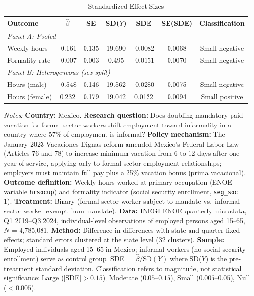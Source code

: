 \begin{table}[t]
\centering
\caption{Standardized Effect Sizes}
\label{tab:sde}
\small
\begin{tabular}{lcccccc}
  \toprule
  Outcome & $\hat{\beta}$ & SE & SD($Y$) & SDE & SE(SDE) & Classification \\
  \midrule
  \multicolumn{7}{l}{\textit{Panel A: Pooled}} \\
  Weekly hours & -0.161 & 0.135 & 19.690 & -0.0082 & 0.0068 & Small negative \\
  Formality rate & -0.007 & 0.003 & 0.495 & -0.0151 & 0.0070 & Small negative \\
  \midrule
  \multicolumn{7}{l}{\textit{Panel B: Heterogeneous (sex split)}} \\
  Hours (male) & -0.548 & 0.146 & 19.562 & -0.0280 & 0.0075 & Small negative \\
  Hours (female) & 0.232 & 0.179 & 19.042 & 0.0122 & 0.0094 & Small positive \\
  \bottomrule
\end{tabular}
\begin{tablenotes}
\small
\item \textit{Notes:} \textbf{Country:} Mexico. \textbf{Research question:} Does doubling mandatory paid vacation for formal-sector workers shift employment toward informality in a country where 57\% of employment is informal? \textbf{Policy mechanism:} The January 2023 Vacaciones Dignas reform amended Mexico's Federal Labor Law (Articles 76 and 78) to increase minimum vacation from 6 to 12 days after one year of service, applying only to formal-sector employment relationships; employers must maintain full pay plus a 25\% vacation bonus (prima vacacional). \textbf{Outcome definition:} Weekly hours worked at primary occupation (ENOE variable \texttt{hrsocup}) and formality indicator (social security enrollment, \texttt{seg\_soc} = 1). \textbf{Treatment:} Binary (formal-sector worker subject to mandate vs.\ informal-sector worker exempt from mandate). \textbf{Data:} INEGI ENOE quarterly microdata, Q1 2019--Q3 2024, individual-level observations of employed persons aged 15--65, $N$ = 4,785,081. \textbf{Method:} Difference-in-differences with state and quarter fixed effects; standard errors clustered at the state level (32 clusters). \textbf{Sample:} Employed individuals aged 15--65 in Mexico; informal workers (no social security enrollment) serve as control group. SDE $= \hat{\beta} / \text{SD}(Y)$ where SD($Y$) is the pre-treatment standard deviation. Classification refers to magnitude, not statistical significance: Large ($|$SDE$| > 0.15$), Moderate ($0.05$--$0.15$), Small ($0.005$--$0.05$), Null ($< 0.005$).
\end{tablenotes}
\end{table}
